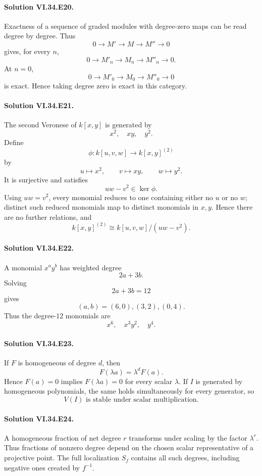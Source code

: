 \paragraph{Solution VI.34.E20.}
Exactness of a sequence of graded modules with degree-zero maps can be read degree by degree. Thus
\[
0\to M'\to M\to M''\to0
\]
gives, for every \(n\),
\[
0\to M'_n\to M_n\to M''_n\to0.
\]
At \(n=0\),
\[
\boxed{
0\to M'_0\to M_0\to M''_0\to0
}
\]
is exact. Hence taking degree zero is exact in this category.

\paragraph{Solution VI.34.E21.}
The second Veronese of \(k[x,y]\) is generated by
\[
x^2,\quad xy,\quad y^2.
\]
Define
\[
\phi:k[u,v,w]\to k[x,y]^{(2)}
\]
by
\[
u\mapsto x^2,\qquad v\mapsto xy,\qquad w\mapsto y^2.
\]
It is surjective and satisfies
\[
uw-v^2\in\ker\phi.
\]
Using \(uw=v^2\), every monomial reduces to one containing either no \(u\) or no \(w\); distinct such reduced
monomials map to distinct monomials in \(x,y\). Hence there are no further relations, and
\[
\boxed{k[x,y]^{(2)}\cong k[u,v,w]/(uw-v^2)}.
\]

\paragraph{Solution VI.34.E22.}
A monomial \(x^ay^b\) has weighted degree
\[
2a+3b.
\]
Solving
\[
2a+3b=12
\]
gives
\[
(a,b)=(6,0),(3,2),(0,4).
\]
Thus the degree-\(12\) monomials are
\[
\boxed{x^6,\quad x^3y^2,\quad y^4}.
\]

\paragraph{Solution VI.34.E23.}
If \(F\) is homogeneous of degree \(d\), then
\[
F(\lambda a)=\lambda^dF(a).
\]
Hence \(F(a)=0\) implies \(F(\lambda a)=0\) for every scalar \(\lambda\). If \(I\) is generated by homogeneous
polynomials, the same holds simultaneously for every generator, so
\[
\boxed{V(I)\text{ is stable under scalar multiplication}}.
\]

\paragraph{Solution VI.34.E24.}
A homogeneous fraction of net degree \(r\) transforms under scaling by the factor \(\lambda^r\). Thus fractions of
nonzero degree depend on the chosen scalar representative of a projective point. The full localization \(S_f\)
contains all such degrees, including negative ones created by \(f^{-1}\).

